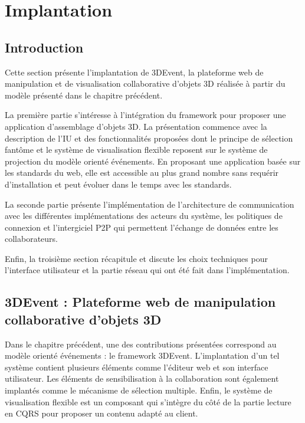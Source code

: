 
\chapter{Implantation}
\chaptertable

\section{Introduction} 
Cette section présente l'implantation de 3DEvent, la plateforme web de 
manipulation et de visualisation collaborative d'objets 3D réalisée à partir du modèle 
présenté dans le chapitre précédent.

La première partie s'intéresse à l'intégration 
du framework pour proposer une application d'assemblage d'objets 3D. La 
présentation commence avec la description de l'\gls{IU} et des fonctionnalités 
proposées dont le principe de sélection fantôme et le système de visualisation 
flexible reposent sur le système de projection du modèle orienté événements. 
En proposant une application basée sur les standards du web, elle est 
accessible au plus grand nombre sans requérir d'installation et peut évoluer dans 
le temps avec les standards. 

La seconde partie présente l'implémentation de l'architecture de communication avec les 
différentes implémentations des acteurs du système, les politiques de connexion et 
l'intergiciel \gls{P2P} qui permettent l'échange de données entre les collaborateurs.

Enfin, la troisième section récapitule et discute les choix techniques pour 
l'interface utilisateur et la partie réseau qui ont été fait dans l'implémentation.


\section{3DEvent : Plateforme web de manipulation collaborative d'objets 3D}
Dans le chapitre précédent, une des contributions présentées correspond au 
modèle orienté événements : le \gls{framework} 3DEvent. 
L'implantation d'un tel système contient plusieurs éléments comme l'éditeur 
web et son interface utilisateur. Les éléments de sensibilisation à la collaboration 
sont également implantés comme le mécanisme de sélection multiple. Enfin, le 
système de visualisation flexible est un composant qui s'intègre du côté de la 
partie lecture en \gls{CQRS} pour proposer un contenu adapté au client. 

